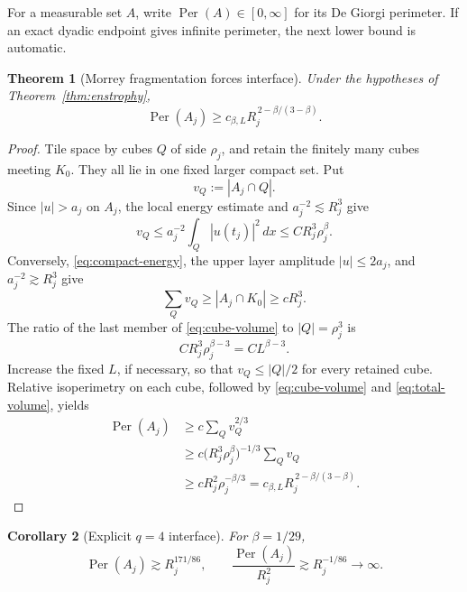 \documentclass[11pt]{article}
\newtheorem{theorem}{Theorem}
\newtheorem{corollary}[theorem]{Corollary}
\theoremstyle{remark}
\newcommand{\Per}{\operatorname{Per}}
\begin{document}
For a measurable set \(A\), write
\(\Per(A)\in[0,\infty]\) for its De Giorgi perimeter.  If an exact
dyadic endpoint gives infinite perimeter, the next lower bound is
automatic.

\begin{theorem}[Morrey fragmentation forces interface]
\label{thm:perimeter}
Under the hypotheses of Theorem~\ref{thm:enstrophy},
\begin{equation}
 \label{eq:perimeter-beta}
 \boxed{
 \Per(A_j)
 \ge
 c_{\beta,L}
 R_j^{\,2-\beta/(3-\beta)}.
 }
\end{equation}
\end{theorem}

\begin{proof}
Tile space by cubes \(Q\) of side \(\rho_j\), and retain the finitely many
cubes meeting \(K_0\).  They all lie in one fixed larger compact set.  Put
\[
 v_Q:=|A_j\cap Q|.
\]
Since \(|u|>a_j\) on \(A_j\), the local energy estimate and
\(a_j^{-2}\lesssim R_j^3\) give
\begin{equation}
 \label{eq:cube-volume}
 v_Q
 \le a_j^{-2}\int_Q|u(t_j)|^2\,dx
 \le CR_j^3\rho_j^\beta.
\end{equation}
Conversely, \eqref{eq:compact-energy}, the upper layer amplitude
\(|u|\le2a_j\), and \(a_j^{-2}\gtrsim R_j^3\) give
\begin{equation}
 \label{eq:total-volume}
 \sum_Qv_Q
 \ge |A_j\cap K_0|
 \ge cR_j^3.
\end{equation}
The ratio of the last member of \eqref{eq:cube-volume} to
\(|Q|=\rho_j^3\) is
\[
 CR_j^3\rho_j^{\beta-3}=CL^{\beta-3}.
\]
Increase the fixed \(L\), if necessary, so that \(v_Q\le|Q|/2\) for every
retained cube.  Relative isoperimetry on each cube, followed by
\eqref{eq:cube-volume} and \eqref{eq:total-volume}, yields
\begin{align*}
 \Per(A_j)
 &\ge c\sum_Qv_Q^{2/3}\\
 &\ge
 c\bigl(R_j^3\rho_j^\beta\bigr)^{-1/3}
 \sum_Qv_Q\\
 &\ge
 cR_j^2\rho_j^{-\beta/3}
 =
 c_{\beta,L}R_j^{\,2-\beta/(3-\beta)}.
\end{align*}
\end{proof}

\begin{corollary}[Explicit \(q=4\) interface]
\label{cor:explicit-perimeter}
For \(\beta=1/29\),
\[
 \Per(A_j)\gtrsim R_j^{171/86},
 \qquad
 \frac{\Per(A_j)}{R_j^2}
 \gtrsim R_j^{-1/86}\longrightarrow\infty.
\]
\end{corollary}
\end{document}
